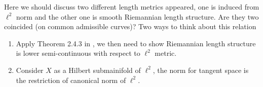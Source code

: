 \begin{rmk}
	Here we should discuss two different length metrics appeared, one is induced from $\ell^2$ norm and the other one is smooth Riemannian length structure. Are they two coincided (on common admissible curves)? Two ways to think about this relation
	\begin{enumerate}
		\item Apply Theorem 2.4.3 in \cite{burago2001course}, we then need to show Riemannian length structure is lower semi-continuous with respect to $\ell^2$ metric.
		\item Consider $X$ as a Hilbert submainifold of $\ell^2$, the norm for tangent space is the restriction of canonical norm of $\ell^2$.
	\end{enumerate}
\end{rmk}
